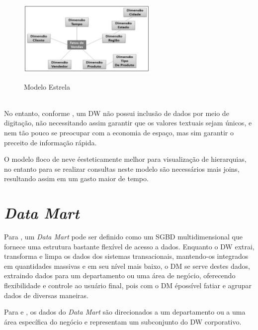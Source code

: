 \begin{figure}[H]
	\vspace*{0,2cm}
    \centering
    \caption{Modelo Estrela}
    \includegraphics[width=0.6\textwidth]{./04-figuras/figura-10}
    \label{fig:ilustfig10}
\end{figure}
\vspace*{-0,9cm}
{\raggedright {}} \\

No entanto, conforme \cite{bi-machado-2018}, um DW n\~{a}o possui inclus\~{a}o de dados por meio de digita\c{c}\~{a}o, n\~{a}o necessitando assim garantir que os valores textuais sejam únicos, e nem t\~{a}o pouco se preocupar com a economia de espa\c{c}o, mas sim garantir o preceito de informa\c{c}\~{a}o r\'{a}pida.

O modelo floco de neve \'{e}esteticamente melhor para visualiza\c{c}\~{a}o de hierarquias, no entanto para se realizar consultas neste modelo s\~{a}o necess\'{a}rios mais joins, resultando assim em um gasto maior de tempo.
	
\section{\textit{Data Mart}}

Para \cite{si-inmon-1997}, um \textit{Data Mart} pode ser definido como um SGBD multidimensional que fornece uma estrutura bastante flex\'{i}vel de acesso a dados. Enquanto o DW extrai, transforma e limpa os dados dos sistemas transacionais, mantendo-os integrados em quantidades massivas e em seu n\'{i}vel mais baixo, o DM se serve destes dados, extraindo dados para um departamento ou uma \'{a}rea de neg\'{o}cio, oferecendo flexibilidade e controle ao usu\'{a}rio final, pois com o DM \'{e}poss\'{i}vel fatiar e agrupar dados de diversas maneiras.

Para \cite{bi-machado-2018} e \cite{dw-kimball-1998}, os dados do \textit{Data Mart} s\~{a}o direcionados a um departamento ou a uma \'{a}rea espec\'{i}fica do neg\'{o}cio e representam um subconjunto do DW corporativo.

